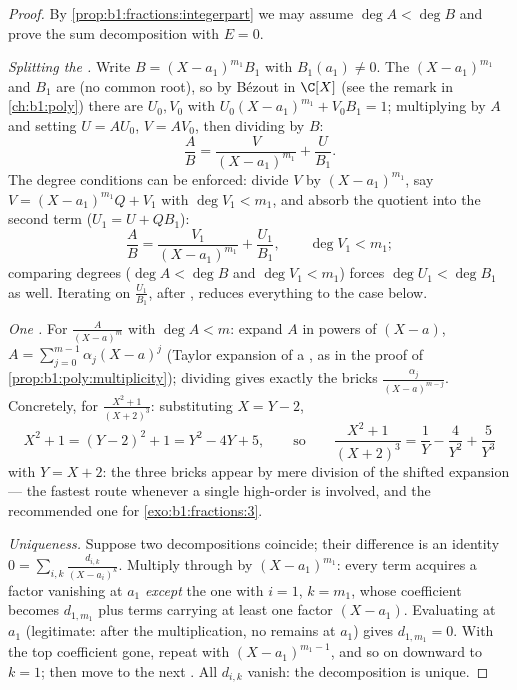 \begin{proof}
By \cref{prop:b1:fractions:integerpart} we may assume $\deg A < \deg
B$ and prove the sum decomposition with $E = 0$.

\emph{Splitting the .} Write $B = (X - a_1)^{m_1} B_1$ with
$B_1(a_1) \neq 0$. The  $(X-a_1)^{m_1}$ and $B_1$ are
 (no common root), so by Bézout in $\C[X]$ (see the remark in
\cref{ch:b1:poly}) there are $U_0, V_0$ with $U_0 (X-a_1)^{m_1} +
V_0 B_1 = 1$; multiplying by $A$ and setting $U = AU_0$, $V =
AV_0$, then dividing by $B$:
\[
\frac AB = \frac{V}{(X - a_1)^{m_1}} + \frac{U}{B_1} .
\]
The degree conditions can be enforced: divide $V$ by
$(X-a_1)^{m_1}$, say $V = (X-a_1)^{m_1}Q + V_1$ with $\deg V_1 <
m_1$, and absorb the quotient into the second term ($U_1 = U +
QB_1$):
\[
\frac AB = \frac{V_1}{(X - a_1)^{m_1}} + \frac{U_1}{B_1},
\qquad \deg V_1 < m_1 ;
\]
comparing degrees ($\deg A < \deg B$ and $\deg V_1 < m_1$) forces
$\deg U_1 < \deg B_1$ as well. Iterating on $\frac{U_1}{B_1}$,
 after , reduces everything to the  case below.

\emph{One .} For $\frac{A}{(X-a)^m}$ with $\deg A < m$: expand $A$
in powers of $(X - a)$, $A = \sum_{j=0}^{m-1} \alpha_j (X - a)^j$
(Taylor expansion of a , as in the proof of
\cref{prop:b1:poly:multiplicity}); dividing gives exactly the bricks
$\frac{\alpha_j}{(X-a)^{m-j}}$. Concretely, for $\frac{X^2 +
1}{(X+2)^3}$: substituting $X = Y - 2$,
\[
X^2 + 1 = (Y - 2)^2 + 1 = Y^2 - 4Y + 5 ,
\qquad\text{so}\qquad
\frac{X^2+1}{(X+2)^3} = \frac1{Y} - \frac4{Y^2} + \frac5{Y^3}
\]
with $Y = X + 2$: the three bricks appear by mere division of the
shifted expansion --- the fastest route whenever a single
high-order  is involved, and the recommended one for
\cref{exo:b1:fractions:3}.

\emph{Uniqueness.} Suppose two decompositions coincide; their
difference is an identity $0 = \sum_{i,k} \frac{d_{i,k}}{(X -
a_i)^k}$. Multiply through by $(X - a_1)^{m_1}$: every term
acquires a factor vanishing at $a_1$ \emph{except} the one with
$i = 1$, $k = m_1$, whose coefficient becomes $d_{1,m_1}$ plus
terms carrying at least one factor $(X - a_1)$. Evaluating at
$a_1$ (legitimate: after the multiplication, no  remains at
$a_1$) gives $d_{1,m_1} = 0$. With the top coefficient gone,
repeat with $(X - a_1)^{m_1 - 1}$, and so on downward to $k = 1$;
then move to the next . All $d_{i,k}$ vanish: the
decomposition is unique.
\end{proof}

